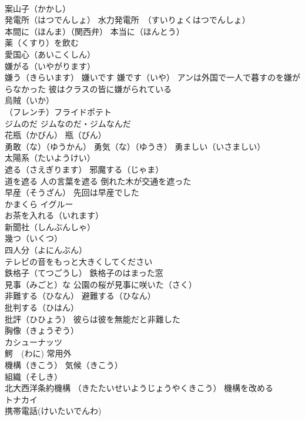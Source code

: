 \documentclass[8pt]{extreport}
\begin{document}
\begin{CJK}{UTF8}{min}
\\	案山子（かかし）
\\	発電所（はつでんしょ） 水力発電所　（すいりょくはつでんしょ）
\\	本間に（ほんま）（関西弁） 本当に（ほんとう）
\\	薬（くすり）を飲む
\\	愛国心（あいこくしん）
\\	嫌がる（いやがります）
\\	嫌う（きらいます） 嫌いです 嫌です（いや） アンは外国で一人で暮すのを嫌がらなかった 彼はクラスの皆に嫌がられている
\\	烏賊（いか）
\\	（フレンチ）フライドポテト
\\	ジムのだ ジムなのだ・ジムなんだ
\\	花瓶（かびん） 瓶（びん）
\\	勇敢（な）（ゆうかん） 勇気（な）（ゆうき） 勇ましい（いさましい）
\\	太陽系（たいようけい）
\\	遮る（さえぎります） 邪魔する（じゃま）
\\	道を遮る 人の言葉を遮る 倒れた木が交通を遮った
\\	早産（そうざん） 先回は早産でした
\\	かまくら イグルー
\\	お茶を入れる（いれます）
\\	新聞社（しんぶんしゃ）
\\	幾つ（いくつ）
\\	四人分（よにんぶん）
\\	テレビの音をもっと大きくしてください
\\	鉄格子（てつごうし） 鉄格子のはまった窓
\\	見事（みごと）な 公園の桜が見事に咲いた（さく）
\\	非難する（ひなん） 避難する（ひなん） 
\\	批判する（ひはん） 
\\	批評（ひひょう） 彼らは彼を無能だと非難した
\\	胸像（きょうぞう） 
\\	カシューナッツ
\\	鰐　(わに) 常用外
\\	機構（きこう） 気候（きこう）
\\	組織（そしき）
\\	北大西洋条約機構 （きたたいせいようじょうやくきこう） 機構を改める
\\	トナカイ
\\	携帯電話(けいたいでんわ)

\end{CJK}
\end{document}
